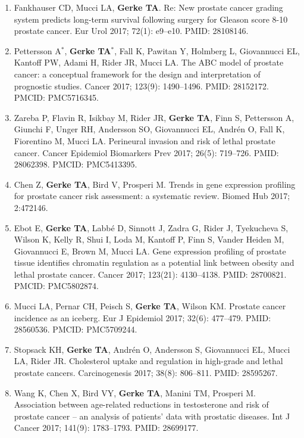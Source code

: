 \documentclass[11pt, a4paper]{article} %
\begin{document}
\begin{enumerate}[leftmargin=*]
\item{} Fankhauser CD, Mucci LA, {\bf Gerke TA}. Re: New prostate cancer grading system predicts long-term survival following surgery for Gleason score 8-10 prostate cancer. Eur Urol 2017; 72(1): e9--e10. PMID: 28108146.

\item{} Pettersson A$^*$, {\bf Gerke TA$^*$}, Fall K, Pawitan Y, Holmberg L, Giovannucci EL, Kantoff PW, Adami H, Rider JR, Mucci LA. The ABC model of prostate cancer: a conceptual framework for the design and interpretation of prognostic studies. Cancer 2017; 123(9): 1490--1496. PMID: 28152172. PMCID: PMC5716345. 

\item{}  Zareba P, Flavin R, Isikbay M, Rider JR, {\bf Gerke TA}, Finn S, Pettersson A, Giunchi F, Unger RH, Andersson SO, Giovannucci EL, Andr\'{e}n O, Fall K, Fiorentino M, Mucci LA. Perineural invasion and risk of lethal prostate cancer. Cancer Epidemiol Biomarkers Prev 2017; 26(5): 719--726. PMID: 28062398. PMCID: PMC5413395.

\item{} Chen Z, {\bf Gerke TA}, Bird V, Prosperi M. Trends in gene expression profiling for prostate cancer risk assessment: a systematic review. Biomed Hub 2017; 2:472146.

\item{} Ebot E, {\bf Gerke TA},  Labb\'{e} D, Sinnott J, Zadra G, Rider J, Tyekucheva S, Wilson K, Kelly R, Shui I, Loda M, Kantoff P, Finn S, Vander Heiden M, Giovannucci E, Brown M, Mucci LA. Gene expression profiling of prostate tissue identifies chromatin regulation as a potential link between obesity and lethal prostate cancer. Cancer 2017; 123(21): 4130--4138. PMID: 28700821. PMCID: PMC5802874.

\item{} Mucci LA, Pernar CH, Peisch S, {\bf Gerke TA}, Wilson KM. Prostate cancer incidence as an iceberg. Eur J Epidemiol 2017; 32(6): 477--479. PMID: 28560536. PMCID: PMC5709244. 

\item{} Stopsack KH, {\bf Gerke TA}, Andr\'{e}n O, Andersson S, Giovannucci EL, Mucci LA, Rider JR. Cholesterol uptake and regulation in high-grade and lethal prostate cancers. Carcinogenesis 2017; 38(8): 806--811. PMID: 28595267.

\item{} Wang K, Chen X, Bird VY, {\bf Gerke TA}, Manini TM, Prosperi M. Association between age-related reductions in testosterone and risk of prostate cancer -- an analysis of patients' data with prostatic diseases. Int J Cancer 2017; 141(9): 1783--1793. PMID: 28699177. 


\end{enumerate}
\end{document}
